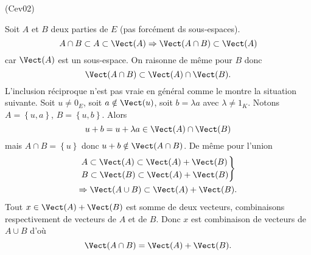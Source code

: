 \begin{tiny}(Cev02)\end{tiny} Soit $A$ et $B$ deux parties de $E$ (pas forcément ds sous-espaces).
\[
  A \cap B \subset A \subset \Vect(A) 
  \Rightarrow \Vect(A\cap B) \subset \Vect(A)
\]
car $\Vect(A)$ est un sous-espace. On raisonne de même pour $B$ donc 
\[
  \Vect(A\cap B) \subset \Vect(A) \cap \Vect(B).
\]
L'inclusion réciproque n'est pas vraie en général comme le montre la situation suivante.\newline
Soit $u\neq 0_E$, soit $a\notin \Vect(u)$, soit $b = \lambda a$ avec $\lambda \neq  1_K$. Notons $A=\left\lbrace u, a\right\rbrace$, $B=\left\lbrace u, b\right\rbrace$. Alors
\[
  u + b = u + \lambda a \in \Vect(A)\cap \Vect(B)
\]
mais $A\cap B= \left\lbrace u\right\rbrace$ donc $u + b \notin \Vect(A\cap B)$.\newline
De même pour l'union
\begin{multline*}
  \left.
  \begin{aligned}
    &A \subset \Vect(A) \subset \Vect(A) + \Vect(B)\\
    &B \subset \Vect(B) \subset \Vect(A) + \Vect(B)
  \end{aligned}
\right\rbrace \\
\Rightarrow \Vect(A \cup B) \subset \Vect(A) + \Vect(B).
\end{multline*}
Tout $x \in \Vect(A) + \Vect(B)$ est somme de deux vecteurs, combinaisons respectivement de vecteurs de $A$ et de $B$. Donc $x$ est combinaison de vecteurs de $A\cup B$ d'où
\[
  \Vect(A\cap B) = \Vect(A) + \Vect(B).
\]
